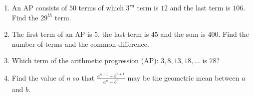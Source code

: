 \begin{enumerate}[label=\thesection.\arabic*,ref=\thesection.\theenumi]
\item An AP consists of $50$ terms of which $3^{rd}$ term is $12$ and the last term is $106$. Find the $29^{th}$ term.\\
\solution 

\pagebreak

\item The first term of an AP is $5$, the last term is $45$ and the sum is $400$. Find the number of terms and the common difference.\\
\solution
\pagebreak

\item Which term of the arithmetic progression (AP): \(3, 8, 13, 18, \ldots\) is \(78\)?\\
\solution

\pagebreak

\item Find the value of $n$ so that $\frac{a^{n+1} + b^{n+1}}{a^{n}+b^{n}}$ may be the geometric mean between $a$ and $b$. \\
\solution

\pagebreak
\end{enumerate}
